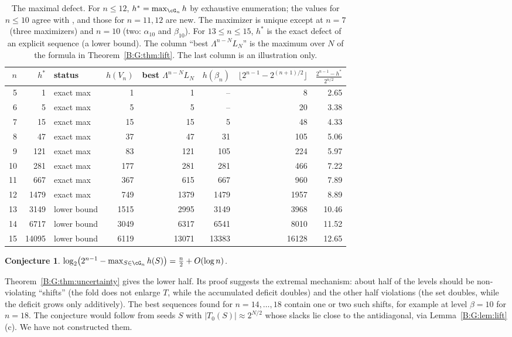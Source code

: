 \documentclass[11pt,a4paper]{article}
\newtheorem{conjecture}[theorem]{Conjecture}
\theoremstyle{definition}
\theoremstyle{remark}
\numberwithin{equation}{section}
\begin{document}
\begin{table}[ht]
\centering\small
\begin{tabular}{rrlrrrrr}
\toprule
$n$ & $h^{*}$ & status & $h(V_n)$ & best $\Lambda^{n-N}L_N$ & $h(\beta_n)$ &
 $\lfloor2^{n-1}-2^{(n+1)/2}\rfloor$ & $\frac{2^{n-1}-h^*}{2^{n/2}}$\\
\midrule
 5 &    1 & exact max &    1 &     1 &    -- &     8 & 2.65\\
 6 &    5 & exact max &    5 &     5 &    -- &    20 & 3.38\\
 7 &   15 & exact max &   15 &    15 &     5 &    48 & 4.33\\
 8 &   47 & exact max &   37 &    47 &    31 &   105 & 5.06\\
 9 &  121 & exact max &   83 &   121 &   105 &   224 & 5.97\\
10 &  281 & exact max &  177 &   281 &   281 &   466 & 7.22\\
11 &  667 & exact max &  367 &   615 &   667 &   960 & 7.89\\
12 & 1479 & exact max &  749 &  1379 &  1479 &  1957 & 8.89\\
13 & 3149 & lower bound & 1515 &  2995 &  3149 &  3968 & 10.46\\
14 & 6717 & lower bound & 3049 &  6317 &  6541 &  8010 & 11.52\\
15 & 14095 & lower bound & 6119 & 13071 & 13383 & 16128 & 12.65\\
\bottomrule
\end{tabular}
\caption{The maximal defect. For $n\le12$, $h^*=\max_{\cG_n}h$ by exhaustive enumeration; the
values for $n\le10$ agree with \cite[Table~1]{R003}, and those for $n=11,12$ are new. The
maximizer is unique except at $n=7$ (three maximizers) and $n=10$ (two:
$\alpha_{10}$ and $\beta_{10}$). For $13\le n\le15$, $h^*$ is the exact defect of an explicit
sequence (a lower bound). The column ``best $\Lambda^{n-N}L_N$'' is the maximum over $N$ of the
formula in Theorem~\ref{B:G:thm:lift}. The last column is an illustration only.}
\label{B:G:tab:defect}
\end{table}

\begin{conjecture}\label{B:G:conj:defect}
$\log_2\bigl(2^{n-1}-\max_{S\in\cG_n}h(S)\bigr)=\tfrac n2+O(\log n)$.
\end{conjecture}

Theorem~\ref{B:G:thm:uncertainty} gives the lower half. Its proof suggests the extremal mechanism:
about half of the levels should be non-violating ``shifts'' (the fold does not enlarge $T$,
while the accumulated deficit doubles) and the other half violations (the set doubles, while the
deficit grows only additively). The best sequences found for $n=14,\dots,18$ contain one or two such shifts,
for example at level $\beta=10$ for $n=18$. The conjecture would follow from seeds $S$ with
$|T_0(S)|\approx2^{N/2}$ whose slacks lie close to the antidiagonal, via
Lemma~\ref{B:G:lem:lift}(c). We have not constructed them.
\end{document}
